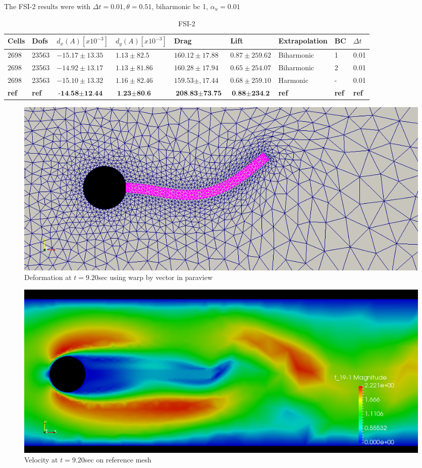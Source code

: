 The FSI-2 results were with $\Delta t = 0.01, \theta = 0.51$, biharmonic bc 1, $\alpha_u = 0.01$
\begin{table}[H]
\centering
\caption{FSI-2}
\label{my-label}
\begin{tabular}{|l|l|l|l|l|l|l|l|l|}
\hline
Cells & Dofs & $d_x(A) [x10^{-3}]$ & $d_y(A) [x10^{-3}]$ & Drag & Lift & Extrapolation & BC & $\Delta t$ \\ \hline
2698 & 23563 & $-15.17 \pm 13.35  $ & $1.13 \pm 82.5$ & $160.12 \pm 17.88$ & $0.87 \pm 259.62$ & Biharmonic & 1 & 0.01 \\ \hline
2698 & 23563 & $-14.92 \pm 13.17 $ & $1.13 \pm 81.86$ & $160.28 \pm 17.94$ & $0.65 \pm 254.07$ & Biharmonic & 2 & 0.01 \\ \hline
2698 & 23563 & $-15.10 \pm 13.32 $ & $1.16 \pm 82.46 $ & $159.53 \pm,17.44 $ & $ 0.68 \pm 259.10 $ & Harmonic & - & 0.01 \\ \hline
\textbf{ref} & \textbf{ref} & $\textbf{-14.58} \pm \textbf{12.44}$ & $\textbf{1.23} \pm \textbf{80.6}$ & $\textbf{208.83} \pm \textbf{73.75}  $ & $\textbf{0.88} \pm \textbf{234.2} $ & \textbf{ref} & \textbf{ref} & \textbf{ref} \\ \hline
\end{tabular}
\end{table}


\begin{figure}[H]
\caption{Deformation at $t =9.20 $sec  using warp by vector in paraview}
\includegraphics[scale=0.40,trim={0mm 0mm 0mm 0mm},clip]{./Verification_Validation/Hron_Turek/FSI2_d_920.png}
\end{figure}
\begin{figure}[H]
\caption{Velocity at $ t = 9.20 $sec on reference mesh}
\includegraphics[scale=0.40,trim={0mm 0mm 0mm 0mm},clip]{./Verification_Validation/Hron_Turek/FSI2_u_920.png}
\end{figure}










